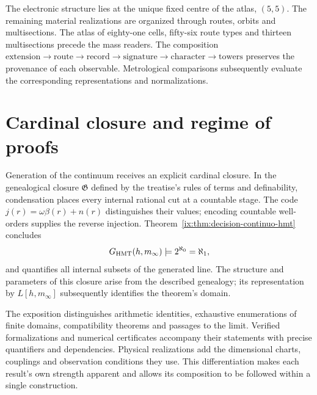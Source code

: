 The electronic structure lies at the unique fixed centre of the atlas, \((5,5)\). The remaining material realizations are organized through routes, orbits and multisections. The atlas of eighty-one cells, fifty-six route types and thirteen multisections precede the mass readers. The composition \(\text{extension}\to\text{route}\to\text{record}\to
\text{signature}\to\text{character}\to\text{towers}\) preserves the provenance of each observable. Metrological comparisons subsequently evaluate the corresponding representations and normalizations.

\section*{Cardinal closure and regime of proofs}

Generation of the continuum receives an explicit cardinal closure. In the genealogical closure \(\mathfrak G\) defined by the treatise's rules of terms and definability, condensation places every internal rational cut at a countable stage. The code \(j(r)=\omega\beta(r)+n(r)\) distinguishes their values; encoding countable well-orders supplies the reverse injection. Theorem~\ref{ix:thm:decision-continuo-hmt} concludes
\[
 \mathfrak G_{\rm HMT}(h,m_\infty)
 \models 2^{\aleph_0}=\aleph_1,
\]
and quantifies all internal subsets of the generated line. The structure and parameters of this closure arise from the described genealogy; its representation by \(L[h,m_\infty]\) subsequently identifies the theorem's domain.

The exposition distinguishes arithmetic identities, exhaustive enumerations of finite domains, compatibility theorems and passages to the limit. Verified formalizations and numerical certificates accompany their statements with precise quantifiers and dependencies. Physical realizations add the dimensional charts, couplings and observation conditions they use. This differentiation makes each result's own strength apparent and allows its composition to be followed within a single construction.
